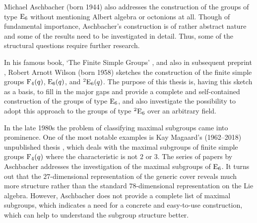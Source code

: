 Michael Aschbacher (born 1944) also addresses the 
construction of the 
groups of type $\mathrm{E}_6$ without mentioning Albert
algebra or octonions at all. Though of fundamental importance,
Aschbacher's construction is of rather abstract nature and some
of the results need to be investigated in detail. 
Thus, some of the structural questions require further research. 

In his famous book, `The Finite Simple Groups' \cite{WilsonBook},
and also in subsequent preprint \cite{WilsonPaper},
Robert Arnott Wilson (born 1958) sketches the
construction of the finite simple groups $\mathrm{F}_4(q)$, 
$\mathrm{E}_6(q)$, and ${}^2\mathrm{E}_6(q)$. The purpose of this thesis is,
having this sketch as a basis, to fill in the major gaps and 
provide a complete and self-contained construction of the groups 
of type $\mathrm{E}_6$, and also investigate the possibility to adopt this
approach to the groups of type ${}^2\mathrm{E}_6$ over an arbitrary field.

In the late 1980s the problem of classifying maximal subgroups 
came into prominence. One of the most notable examples is
Kay Magaard's (1962--2018) unpublished thesis \cite{Magaard}, which deals
with the maximal subgroups of finite simple groups $\mathrm{F}_4(q)$
where the characteristic is not $2$ or $3$. The series of papers by 
Aschbacher \cite{Asch1,Asch2,Asch3,Asch4} addresses the investigation
of the maximal subgroups of $\mathrm{E}_6$. It turns out that the $27$-dimensional
representation of the generic cover reveals much more structure rather 
than the standard $78$-dimensional representation on the Lie algebra.
However, Aschbacher does not provide a complete list of maximal subgroups, 
which indicates a need for a concrete and easy-to-use construction, which can
help to understand the subgroup structure better. 



